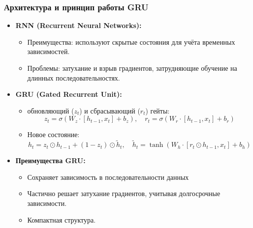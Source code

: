 \documentclass
  [ russian
  , aspectratio=1610 %
  ] {beamer}
\begin{document}
\begin{frame}
    \frametitle{Архитектура и принцип работы GRU}
    \begin{itemize}
        \item \textbf{RNN (Recurrent Neural Networks):}
        \begin{itemize}
            \item Преимущества: используют скрытые состояния для учёта временных зависимостей.
            \item Проблемы: затухание и взрыв градиентов, затрудняющие обучение на длинных последовательностях.
        \end{itemize}
        \item \textbf{GRU (Gated Recurrent Unit):}
        \begin{itemize}
            \item обновляющий (\( z_t \)) и сбрасывающий (\( r_t \)) гейты:
            \[
            z_t = \sigma(W_z \cdot [h_{t-1}, x_t] + b_z), \quad
            r_t = \sigma(W_r \cdot [h_{t-1}, x_t] + b_r)
            \]
            \item Новое состояние:
            \[
            h_t = z_t \odot h_{t-1} + (1 - z_t) \odot \tilde{h}_t, \quad
            \tilde{h}_t = \tanh(W_h \cdot [r_t \odot h_{t-1}, x_t] + b_h)
            \]
        \end{itemize}
        \item \textbf{Преимущества GRU:}
        \begin{itemize}
            \item Сохраняет зависимость в последовательности данных
            \item Частично решает затухание градиентов, учитывая долгосрочные зависимости.
            \item Компактная структура.
        \end{itemize}
    \end{itemize}
\end{frame}
\end{document}
